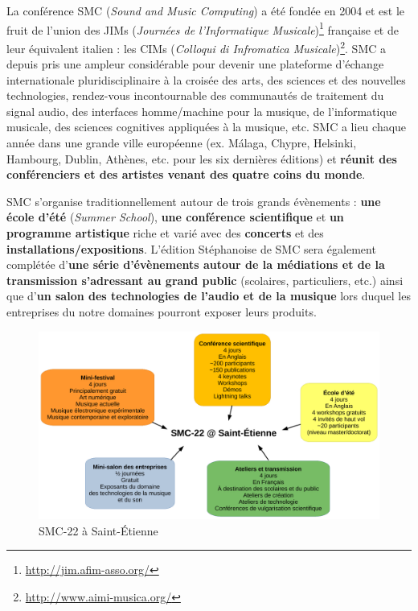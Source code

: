 \documentclass[fontsize=12pt]{scrartcl} %
\numberwithin{equation}{section} %
\numberwithin{table}{section} %
\begin{document}
La conférence SMC (\textit{Sound and Music Computing}) a été fondée en 2004 et est le fruit de l'union des JIMs (\textit{Journées de l'Informatique Musicale})\footnote{\url{http://jim.afim-asso.org/}} française et de leur équivalent italien : les CIMs (\textit{Colloqui di Infromatica Musicale})\footnote{\url{http://www.aimi-musica.org/}}. SMC a depuis pris une ampleur considérable pour devenir une plateforme d'échange internationale pluridisciplinaire à la croisée des arts, des sciences et des nouvelles technologies, rendez-vous incontournable des communautés de traitement du signal audio, des interfaces homme/machine pour la musique, de l'informatique musicale, des sciences cognitives appliquées à la musique, etc. SMC a lieu chaque année dans une grande ville européenne (ex. Málaga, Chypre, Helsinki, Hambourg, Dublin, Athènes, etc. pour les six dernières éditions) et \textbf{réunit des conférenciers et des artistes venant des quatre coins du monde}.

SMC s'organise traditionnellement autour de trois grands évènements : \textbf{une école d'été} (\textit{Summer School}), \textbf{une conférence scientifique} et \textbf{un programme artistique} riche et varié avec des \textbf{concerts} et des \textbf{installations/expositions}. L'édition Stéphanoise de SMC sera également complétée d'\textbf{une série d'évènements autour de la médiations et de la transmission s'adressant au grand public} (scolaires, particuliers, etc.) ainsi que d'\textbf{un salon des technologies de l'audio et de la musique} lors duquel les entreprises du notre domaines pourront exposer leurs produits. 

\begin{figure}[h]
  \centering
  \includegraphics[width=\columnwidth]{img/overview}
  \caption{SMC-22 à Saint-Étienne}
  \label{fig:overview}
\end{figure}
\end{document}
